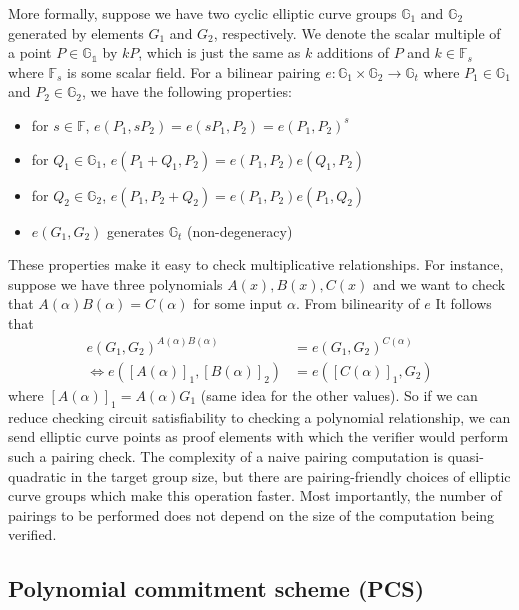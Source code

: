 \noindent More formally, suppose we have two cyclic elliptic curve groups $\mathbb{G}_1$ and $\mathbb{G}_2$ generated by elements $G_1$ and $G_2$, respectively. We denote the scalar multiple of a point $P \in \mathbb{G_1}$ by $kP$, which is just the same as $k$ additions of $P$ and $k \in \mathbb{F}_s$ where $\mathbb{F}_s$ is some scalar field. For a bilinear pairing $e: \mathbb{G}_1 \times \mathbb{G}_2 \to \mathbb{G}_t$ where $P_1 \in \mathbb{G}_1$ and $P_2 \in \mathbb{G}_2$, we have the following properties:
\begin{itemize}
    \item for $s \in \mathbb{F}$, $e(P_1, sP_2) = e(sP_1, P_2) = e(P_1, P_2)^s$
    \item for $Q_1 \in \mathbb{G}_1$, $e(P_1+Q_1, P_2) = e(P_1, P_2) e(Q_1, P_2)$
    \item for $Q_2 \in \mathbb{G}_2$, $e(P_1, P_2+Q_2) = e(P_1, P_2) e(P_1, Q_2)$
    \item $e(G_1, G_2)$ generates $\mathbb{G}_t$ (non-degeneracy)
\end{itemize}

These properties make it easy to check multiplicative relationships. For instance, suppose we have three polynomials $A(x), B(x), C(x)$ and we want to check that $A(\alpha)B(\alpha) = C(\alpha)$ for some input $\alpha$. From bilinearity of $e$ It follows that 
\begin{align}
e(G_1, G_2)^{A(\alpha)B(\alpha)} &= e(G_1, G_2)^{C(\alpha)} \\
\Leftrightarrow e([A(\alpha)]_1, [B(\alpha)]_2) &= e([C(\alpha)]_1, G_2)
\end{align}
where $[A(\alpha)]_1 = A(\alpha)G_1$ (same idea for the other values). So if we can reduce checking circuit satisfiability to checking a polynomial relationship, we can send elliptic curve points as proof elements with which the verifier would perform such a pairing check. The complexity of a naive pairing computation is quasi-quadratic in the target group size, but there are pairing-friendly choices of elliptic curve groups which make this operation faster. Most importantly, the number of pairings to be performed does not depend on the size of the computation being verified.

\subsection{Polynomial commitment scheme (PCS)}

